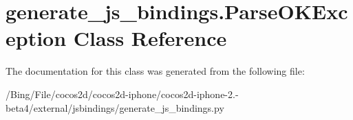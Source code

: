 \hypertarget{classgenerate__js__bindings_1_1_parse_o_k_exception}{\section{generate\-\_\-js\-\_\-bindings.\-Parse\-O\-K\-Exception Class Reference}
\label{classgenerate__js__bindings_1_1_parse_o_k_exception}
}


The documentation for this class was generated from the following file\-:\begin{DoxyCompactItemize}
\item 
/\-Bing/\-File/cocos2d/cocos2d-\/iphone/cocos2d-\/iphone-\/2.-\/beta4/external/jsbindings/generate\-\_\-js\-\_\-bindings.\-py\end{DoxyCompactItemize}
